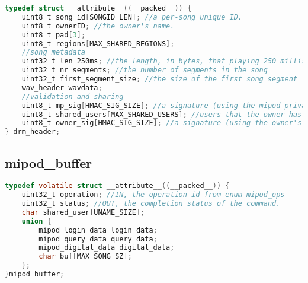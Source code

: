 \documentclass[11pt]{extarticle}
\begin{document}
    \begin{lstlisting}[language=C, label={lst:cache}, style=manual_code]
typedef struct __attribute__((__packed__)) {
    uint8_t song_id[SONGID_LEN]; //a per-song unique ID.
    uint8_t ownerID; //the owner's name.
    uint8_t pad[3];
    uint8_t regions[MAX_SHARED_REGIONS];
    //song metadata
    uint32_t len_250ms; //the length, in bytes, that playing 250 milliseconds of audio will take.
    uint32_t nr_segments; //the number of segments in the song
    uint32_t first_segment_size; //the size of the first song segment including trailer.
    wav_header wavdata;
    //validation and sharing
    uint8_t mp_sig[HMAC_SIG_SIZE]; //a signature (using the mipod private key) for all preceeding data
    uint8_t shared_users[MAX_SHARED_USERS]; //users that the owner has shared the song with.
    uint8_t owner_sig[HMAC_SIG_SIZE]; //a signature (using the owner's private key) for all preceeding data. resets whenever new user is shared with.
} drm_header;
    \end{lstlisting}

\subsection{mipod\_buffer}

    \begin{lstlisting}[language=C, label={lst:cache}, style=manual_code]
typedef volatile struct __attribute__((__packed__)) {
    uint32_t operation; //IN, the operation id from enum mipod_ops
    uint32_t status; //OUT, the completion status of the command. 
    char shared_user[UNAME_SIZE];
    union {
        mipod_login_data login_data;
        mipod_query_data query_data;
        mipod_digital_data digital_data;
        char buf[MAX_SONG_SZ];
    };
}mipod_buffer;
    \end{lstlisting}
    
\end{document}
